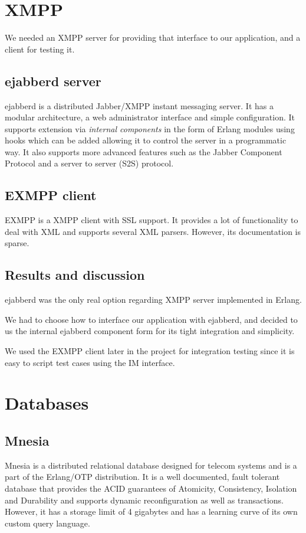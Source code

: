 \documentclass[11pt,a4paper]{report}
\begin{document}
\section{XMPP}
We needed an XMPP server for providing that interface to our application, and a
client for testing it.

\subsection{ejabberd server}
ejabberd is a distributed Jabber/XMPP instant messaging server. It has a modular
architecture, a web administrator interface and simple configuration. It
supports extension via \emph{internal components} in the form of Erlang modules
using hooks which can be added allowing it to control the server in a
programmatic way\cite{ejabberd-plugin}. It also supports more advanced features
such as the Jabber Component Protocol \cite{xmpp-component} and a server to
server (S2S) protocol\cite{xmpp-s2s}.

\subsection{EXMPP client}
EXMPP is a XMPP client with SSL support. It provides a lot of functionality to
deal with XML and supports several XML parsers. However, its documentation is
sparse.

\subsection{Results and discussion}
ejabberd was the only real option regarding XMPP server implemented in Erlang.

We had to choose how to interface our application with ejabberd, and decided
to us the internal ejabberd component form for its tight integration and
simplicity.

We used the EXMPP client later in the project for integration
testing since it is easy to script test cases using the IM interface.

\section{Databases}
\subsection{Mnesia}
Mnesia is a distributed relational database designed for telecom systems and is
a part of the Erlang/OTP distribution. It is a well documented, fault tolerant
database that provides the ACID\cite{ACID} guarantees of Atomicity, Consistency,
Isolation and Durability and supports dynamic reconfiguration as well
as transactions. However, it has a storage limit of 4 gigabytes and has a
learning curve of its own custom query language.
\end{document}
